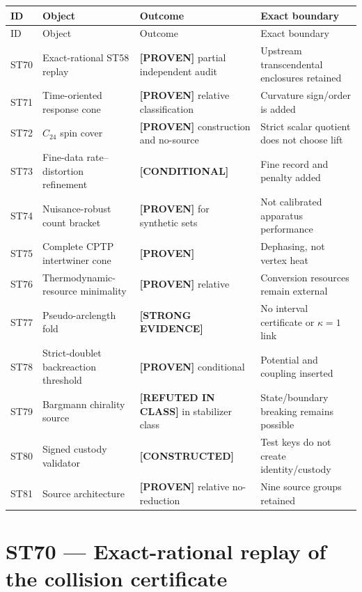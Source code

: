 \documentclass[11pt,a4paper]{article}
\newcommand{\proven}{\textcolor{green!40!black}{\textbf{[PROVEN]}}}
\newcommand{\strong}{\textcolor{blue!70!black}{\textbf{[STRONG EVIDENCE]}}}
\newcommand{\conditional}{\textcolor{black!60}{\textbf{[CONDITIONAL]}}}
\newcommand{\constructed}{\textcolor{violet!70!black}{\textbf{[CONSTRUCTED]}}}
\newcommand{\failed}{\textcolor{red!72!black}{\textbf{[REFUTED IN CLASS]}}}
\begin{document}
\small
\begin{longtable}{@{}p{}p{}p{}p{}@{}}
\toprule
ID & Object & Outcome & Exact boundary\\
\midrule
\endfirsthead
\toprule
ID & Object & Outcome & Exact boundary\\
\midrule
\endhead
ST70 & Exact-rational ST58 replay & \proven{} partial independent audit & Upstream transcendental enclosures retained\\
ST71 & Time-oriented response cone & \proven{} relative classification & Curvature sign/order is added\\
ST72 & $C_{24}$ spin cover & \proven{} construction and no-source & Strict scalar quotient does not choose lift\\
ST73 & Fine-data rate--distortion refinement & \conditional{} & Fine record and penalty added\\
ST74 & Nuisance-robust count bracket & \proven{} for synthetic sets & Not calibrated apparatus performance\\
ST75 & Complete CPTP intertwiner cone & \proven{} & Dephasing, not vertex heat\\
ST76 & Thermodynamic-resource minimality & \proven{} relative & Conversion resources remain external\\
ST77 & Pseudo-arclength fold & \strong{} & No interval certificate or $\kappa=1$ link\\
ST78 & Strict-doublet backreaction threshold & \proven{} conditional & Potential and coupling inserted\\
ST79 & Bargmann chirality source & \failed{} in stabilizer class & State/boundary breaking remains possible\\
ST80 & Signed custody validator & \constructed{} & Test keys do not create identity/custody\\
ST81 & Source architecture & \proven{} relative no-reduction & Nine source groups retained\\
\bottomrule
\end{longtable}
\normalsize

\section{ST70 --- Exact-rational replay of the collision certificate}
\end{document}
